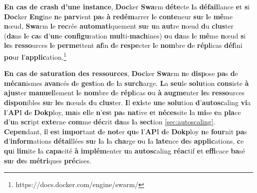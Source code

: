 \documentclass{rapportClass} %
\begin{document}
\textbf{\textbf{E}n \textbf{ca}s \textbf{d}e \textbf{cra}sh \textbf{d}'\textbf{un}e \textbf{inst}ance}, \textbf{Doc}ker \textbf{Swa}rm \textbf{déte}cte \textbf{l}a \textbf{défail}lance \textbf{e}t \textbf{s}i \textbf{Doc}ker \textbf{Eng}ine \textbf{n}e \textbf{parv}ient \textbf{pa}s \textbf{à} 
\textbf{redém}arrer \textbf{l}e \textbf{conte}neur \textbf{su}r \textbf{l}e \textbf{mê}me \textbf{n}œud, \textbf{Swa}rm \textbf{l}e \textbf{rec}rée \textbf{automati}quement \textbf{su}r \textbf{u}n \textbf{aut}re \textbf{n}œud \textbf{d}u \textbf{clus}ter 
(\textbf{da}ns \textbf{l}e \textbf{ca}s \textbf{d}'\textbf{un}e \textbf{configu}ration \textbf{mul}ti-\textbf{mach}ines) \textbf{o}u \textbf{da}ns \textbf{l}e \textbf{mê}me \textbf{n}œud \textbf{s}i \textbf{le}s \textbf{resso}urces \textbf{l}e \textbf{perme}ttent \textbf{af}in \textbf{d}e 
\textbf{respe}cter \textbf{l}e \textbf{nom}bre \textbf{d}e \textbf{répl}icas \textbf{déf}ini \textbf{po}ur \textbf{l}'\textbf{applic}ation.\footnote{https://docs.docker.com/engine/swarm/}

\textbf{\textbf{E}n \textbf{ca}s \textbf{d}e \textbf{satur}ation \textbf{de}s \textbf{resso}urces}, \textbf{Doc}ker \textbf{Swa}rm \textbf{n}e \textbf{disp}ose \textbf{pa}s \textbf{d}e \textbf{mécan}ismes \textbf{avan}cés \textbf{d}e \textbf{gest}ion \textbf{d}e \textbf{l}a
\textbf{surch}arge. \textbf{L}a \textbf{seu}le \textbf{solu}tion \textbf{cons}iste \textbf{à} \textbf{ajus}ter \textbf{manuel}lement \textbf{l}e \textbf{nom}bre \textbf{d}e \textbf{répl}icas \textbf{o}u \textbf{à} \textbf{augme}nter \textbf{le}s \textbf{resso}urces 
\textbf{dispon}ibles \textbf{su}r \textbf{le}s \textbf{n}œuds \textbf{d}u \textbf{clus}ter. \textbf{I}l \textbf{exi}ste \textbf{un}e \textbf{solu}tion \textbf{d}'\textbf{autosc}aling \textbf{vi}a \textbf{l}'\textbf{AP}I \textbf{d}e \textbf{Dokp}loy, \textbf{ma}is \textbf{el}le \textbf{n}'\textbf{es}t \textbf{pa}s 
\textbf{nat}ive \textbf{e}t \textbf{néces}site \textbf{l}a \textbf{mi}se \textbf{e}n \textbf{pla}ce \textbf{d}'\textbf{u}n \textbf{scr}ipt \textbf{exte}rne \textbf{com}me \textbf{déc}rit \textbf{da}ns \textbf{l}a \textbf{sect}ion \ref{sec:autoscaling}.
\textbf{Cepen}dant, \textbf{i}l \textbf{es}t \textbf{impor}tant \textbf{d}e \textbf{not}er \textbf{qu}e \textbf{l}'\textbf{AP}I \textbf{d}e \textbf{Dokp}loy \textbf{n}e \textbf{four}nit \textbf{pa}s \textbf{d}'\textbf{inform}ations \textbf{détai}llées \textbf{su}r \textbf{l}a \textbf{l}a \textbf{cha}rge \textbf{o}u
\textbf{l}a \textbf{late}nce \textbf{de}s \textbf{applic}ations, \textbf{c}e \textbf{qu}i \textbf{lim}ite \textbf{l}a \textbf{capa}cité \textbf{à} \textbf{implém}enter \textbf{u}n \textbf{autosc}aling \textbf{réac}tif \textbf{e}t \textbf{effi}cace \textbf{ba}sé \textbf{su}r \textbf{de}s \textbf{métri}ques \textbf{préc}ises.
\end{document}
